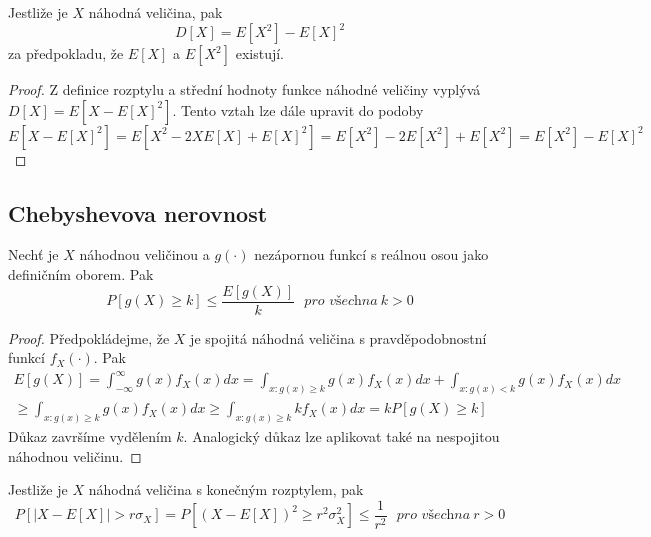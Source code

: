 \begin{theorem}
Jestliže je $X$ náhodná veličina, pak
\begin{equation*}
D[X] = E[X^2] - E[X]^2
\end{equation*}
za předpokladu, že $E[X]$ a $E[X^2]$ existují.
\end{theorem}

\begin{proof}
Z definice rozptylu a střední hodnoty funkce náhodné veličiny vyplývá $D[X] = E[X - E[X]^2]$. Tento vztah lze dále upravit do podoby
\begin{equation*}
E[X - E[X]^2] = E[X^2 - 2XE[X] + E[X]^2] = E[X^2] - 2E[X^2] + E[X^2] = E[X^2] - E[X]^2
\end{equation*}
\end{proof}

\subsection{Chebyshevova nerovnost}

\begin{theorem}
Nechť je $X$ náhodnou veličinou a $g(\cdot)$ nezápornou funkcí s reálnou osou jako definičním oborem. Pak
\begin{equation*}
P[g(X) \ge k] \le \frac{E[g(X)]}{k}~~~\textit{pro všechna}~k>0
\end{equation*}
\end{theorem}

\begin{proof}
Předpokládejme, že $X$ je spojitá náhodná veličina s pravděpodobnostní funkcí $f_X(\cdot)$. Pak
\begin{gather*}
E[g(X)] = \int_{-\infty}^{\infty} g(x)f_X(x)dx = \int_{x: g(x) \ge k} g(x) f_X(x)dx + \int_{x: g(x) < k}g(x)f_X(x)dx\\
\ge \int_{x: g(x) \ge k}g(x)f_X(x)dx \ge \int_{x: g(x) \ge k} k f_X(x)dx = k P[g(X) \ge k]
\end{gather*}
Důkaz završíme vydělením $k$. Analogický důkaz lze aplikovat také na nespojitou náhodnou veličinu.
\end{proof}

\begin{corollary}
Jestliže je $X$ náhodná veličina s konečným rozptylem, pak
\begin{equation*}
P[|X - E[X]| > r \sigma_X] = P[(X - E[X])^2 \ge r^2 \sigma_X^2] \le \frac{1}{r^2}~~~\textit{pro všechna}~r>0
\end{equation*}
\end{corollary}

